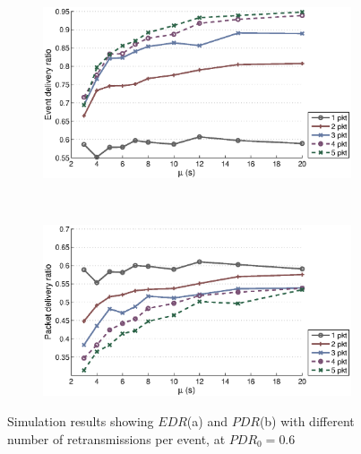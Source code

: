 \begin{figure}[p]
    \centering
    \begin{subfigure}[t]{0.9\textwidth}
        \centering
        \includegraphics[width=\textwidth] {../../sw/pc/matlab/simulation-result/retrans-count-edr-250evt-pdr0.6.eps}
        \caption{}
    \end{subfigure} 
    \\
    \begin{subfigure}[t]{0.9\textwidth}
        \centering
        \includegraphics[width=\textwidth] {../../sw/pc/matlab/simulation-result/retrans-count-pdr-250evt-pdr0.6.eps}
        \caption{}
    \end{subfigure}
    \caption[$EDR$ and $PDR$ with different transmission redundancy, $PDR_0 = 0.6$]{Simulation results showing $EDR$(a) and $PDR$(b) with different number of retransmissions per event, at $PDR_0 = 0.6$}\label{fig:retrans-lambda-0.6}
\end{figure}



